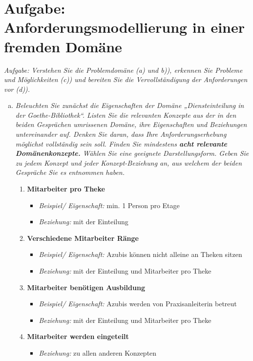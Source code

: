\section{Aufgabe: Anforderungsmodellierung in einer fremden Domäne}
{\itshape Aufgabe: Verstehen Sie die Problemdomäne (a) und b)), erkennen Sie Probleme und Möglichkeiten (c)) und bereiten Sie die Vervollständigung der Anforderungen vor (d)).}

\begin{enumerate} [a)]
    \item {\itshape Beleuchten Sie zunächst die Eigenschaften der Domäne „Diensteinteilung in der Goethe-Bibliothek“. Listen Sie die relevanten Konzepte aus der in den beiden Gesprächen umrissenen Domäne, ihre Eigenschaften und Beziehungen untereinander auf. Denken Sie daran, dass Ihre Anforderungserhebung möglichst vollständig sein soll. Finden Sie mindestens \textbf{acht relevante Domänenkonzepte.} Wählen Sie eine geeignete Darstellungsform. Geben Sie zu jedem Konzept und jeder Konzept-Beziehung an, aus welchem der beiden Gespräche Sie es entnommen haben.}
    
    \begin{enumerate}[1.]
        \item \textbf{Mitarbeiter pro Theke}
        \begin{itemize}
            \item \emph{Beispiel/ Eigenschaft:}  min. 1 Person pro Etage
            \item \emph{Beziehung:} mit der Einteilung
        \end{itemize}
        
        \item \textbf{Verschiedene Mitarbeiter Ränge}
        \begin{itemize}
            \item \emph{Beispiel/ Eigenschaft:} Azubis können nicht alleine an Theken sitzen
            \item \emph{Beziehung:} mit der Einteilung und Mitarbeiter pro Theke
        \end{itemize}
        
        \item \textbf{Mitarbeiter benötigen Ausbildung}
        \begin{itemize}
            \item \emph{Beispiel/ Eigenschaft:}  Azubis werden von Praxisanleiterin betreut
            \item \emph{Beziehung:} mit der Einteilung und Mitarbeiter pro Theke
        \end{itemize}
\newpage        
        \item \textbf{Mitarbeiter werden eingeteilt}
        \begin{itemize}
            \item \emph{Beziehung:} zu allen anderen Konzepten
        \end{itemize}
        

\end{enumerate}
\end{enumerate}
